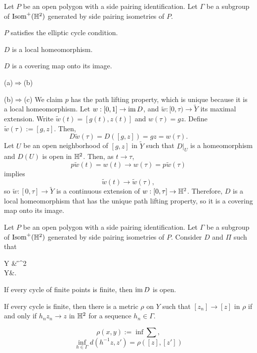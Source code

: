 \documentclass[a4paper]{article}
\begin{document}
\begin{prb}
Let $P$ be an open polygon with a side pairing identification.
Let $\Gamma$ be a subgroup of $\operatorname{Isom}^+(\mathbb{H}^2)$ generated by side pairing isometries of $P$.
\begin{parts}
\item $P$ satisfies the elliptic cycle condition.
\item $D$ is a local homeomorphism.
\item $D$ is a covering map onto its image.
\end{parts}
\end{prb}
\begin{pf}
(a)$\Rightarrow$(b)

(b)$\Rightarrow$(c)
We claim $p$ has the path lifting property, which is unique because it is a local homeomorphism.
Let $w:[0,1]\to\operatorname{im} D$, and $\tilde w:[0,\tau)\to\tilde Y$ its maximal extension.
Write $\tilde w(t)=[g(t),z(t)]$ and $w(\tau)=gz$.
Define $\tilde w(\tau):=[g,z]$.
Then,
\[D\tilde w(\tau)=D([g,z])=gz=w(\tau).\]
Let $U$ be an open neighborhood of $[g,z]$ in $\tilde Y$ such that $D|_U$ is a homeomorphism and $D(U)$ is open in $\mathbb{H}^2$.
Then, as $t\to\tau$,
\[p\tilde w(t)=w(t)\to w(\tau)=p\tilde w(\tau)\]
implies
\[\tilde w(t)\to\tilde w(\tau),\]
so $\tilde w:[0,\tau]\to\tilde Y$ is a continuous extension of $w:[0,\tau]\to\mathbb{H}^2$.
Therefore, $D$ is a local homeomorphism that has the unique path lifting property, so it is a covering map onto its image.
\end{pf}

\begin{prb}
Let $P$ be an open polygon with a side pairing identification.
Let $\Gamma$ be a subgroup of $\operatorname{Isom}^+(\mathbb{H}^2)$ generated by side pairing isometries of $P$.
Consider $D$ and $\Pi$ such that
\begin{cd}
\tilde Y\dar{\Pi} & \H^2\\
Y&.
\end{cd}
\begin{parts}
\item If every cycle of finite points is finite, then $\operatorname{im} D$ is open.
\item If every cycle is finite, then there is a metric $\rho$ on $Y$ such that $[z_n]\to[z]$ in $\rho$ if and only if $h_nz_n\to z$ in $\mathbb{H}^2$ for a sequence $h_n\in\Gamma$.
\end{parts}
\end{prb}
\begin{pf}
\[\rho(x,y):=\inf\sum,\]
\[\inf_{h\in\Gamma}d(h^{-1}z,z')=\rho([z],[z'])\]
\end{pf}
\end{document}
